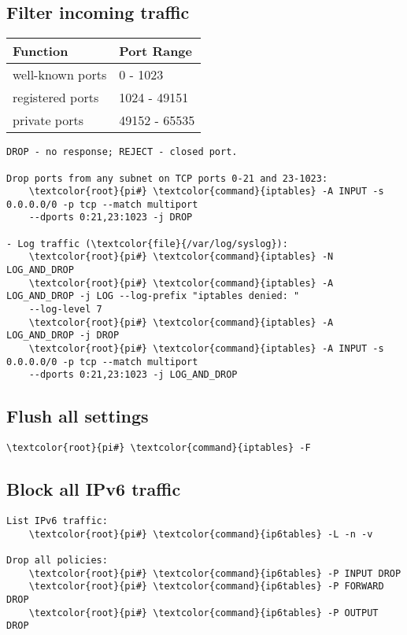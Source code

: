 \documentclass[10pt, a4paper, onecolumn, openany]{book} %
\begin{document}
\subsection{Filter incoming traffic}
\begin{center}
    \begin{small}
    \begin{tabular}{|p{4cm}|p{4cm}|}
    \hline
    \textbf{Function} & \textbf{Port Range} \\
    \hline
    well-known ports & 0 - 1023  \\
    \hline
    registered ports & 1024 - 49151 \\
    \hline
    private ports & 49152 - 65535 \\
    \hline
    \end{tabular}
    \end{small}
\end{center}
\begin{Verbatim}[commandchars=\\\{\}]
DROP - no response; REJECT - closed port.

Drop ports from any subnet on TCP ports 0-21 and 23-1023:
    \textcolor{root}{pi#} \textcolor{command}{iptables} -A INPUT -s 0.0.0.0/0 -p tcp --match multiport
    --dports 0:21,23:1023 -j DROP
    
- Log traffic (\textcolor{file}{/var/log/syslog}):    
    \textcolor{root}{pi#} \textcolor{command}{iptables} -N LOG_AND_DROP
    \textcolor{root}{pi#} \textcolor{command}{iptables} -A LOG_AND_DROP -j LOG --log-prefix "iptables denied: "
    --log-level 7
    \textcolor{root}{pi#} \textcolor{command}{iptables} -A LOG_AND_DROP -j DROP    
    \textcolor{root}{pi#} \textcolor{command}{iptables} -A INPUT -s 0.0.0.0/0 -p tcp --match multiport
    --dports 0:21,23:1023 -j LOG_AND_DROP
\end{Verbatim}

\subsection{Flush all settings}
\begin{Verbatim}[commandchars=\\\{\}]
    \textcolor{root}{pi#} \textcolor{command}{iptables} -F
\end{Verbatim}

\subsection{Block all IPv6 traffic}
\begin{Verbatim}[commandchars=\\\{\}]
List IPv6 traffic:
    \textcolor{root}{pi#} \textcolor{command}{ip6tables} -L -n -v   

Drop all policies:
    \textcolor{root}{pi#} \textcolor{command}{ip6tables} -P INPUT DROP
    \textcolor{root}{pi#} \textcolor{command}{ip6tables} -P FORWARD DROP
    \textcolor{root}{pi#} \textcolor{command}{ip6tables} -P OUTPUT DROP 
\end{Verbatim}
\end{document}

